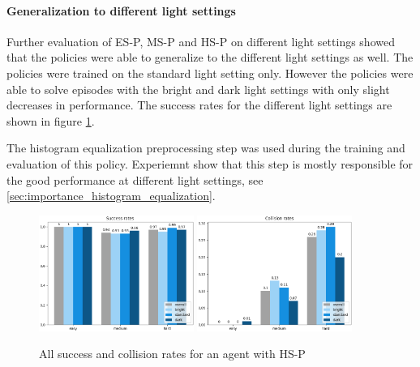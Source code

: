 \paragraph{Generalization to different light settings}
\label{cha:experiment_fixed_difficulty_light_settings}

Further evaluation of \ac{ES-P}, \ac{MS-P} and \ac{HS-P} on different light settings showed that the policies were able to generalize to the different light settings as well. The policies were trained on the standard light setting only. However the policies were able to solve episodes with the bright and dark light settings with only slight decreases in performance. The success rates for the different light settings are shown in figure \ref{fig:hardDistance_generalization_light_settings}.

The histogram equalization preprocessing step was used during the training and evaluation of this policy. Experiemnt show that this step is mostly responsible for the good performance at different light settings, see \ref{sec:importance_histogram_equalization}.

\begin{figure}
    \centering
    \includegraphics[width=0.45\textwidth]{Bilder/notebook_images/hardDistanceStandardLight_eval_all_success_rates_barplot.png}
    \includegraphics[width=0.45\textwidth]{Bilder/notebook_images/hardDistanceStandardLight_eval_all_collision_rates_barplot.png}
    \caption{All success and collision rates for an agent with \ac{HS-P}}
    \label{fig:hardDistance_generalization_light_settings}
\end{figure}

